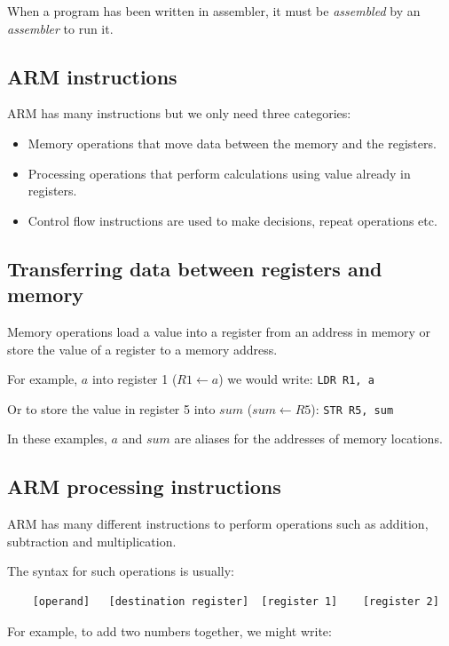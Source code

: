 When a program has been written in assembler, it must be {\it assembled} by an
{\it assembler} to run it.

\subsection{ARM instructions}

ARM has many instructions but we only need three categories:

\begin{itemize}
	\item Memory operations that move data between the memory and the registers.
	\item Processing operations that perform calculations using value already in
	registers.
	\item Control flow instructions are used to make decisions, repeat 
	operations etc.
\end{itemize}

\subsection{Transferring data between registers and memory}

Memory operations load a value into a register from an address in memory or
store the value of a register to a memory address.

For example, $a$ into register 1 ($R1 \leftarrow a$) we would write:
{\tt LDR R1, a}

Or to store the value in register 5 into $sum$ ($sum \leftarrow R5$):
{\tt STR R5, sum}

In these examples, $a$ and $sum$ are aliases for the addresses of memory
locations.

\subsection{ARM processing instructions}

ARM has many different instructions to perform operations such as addition,
subtraction and multiplication.

The syntax for such operations is usually:

\begin{verbatim}
	[operand]	[destination register]	[register 1]	[register 2]
\end{verbatim}

For example, to add two numbers together, we might write:

